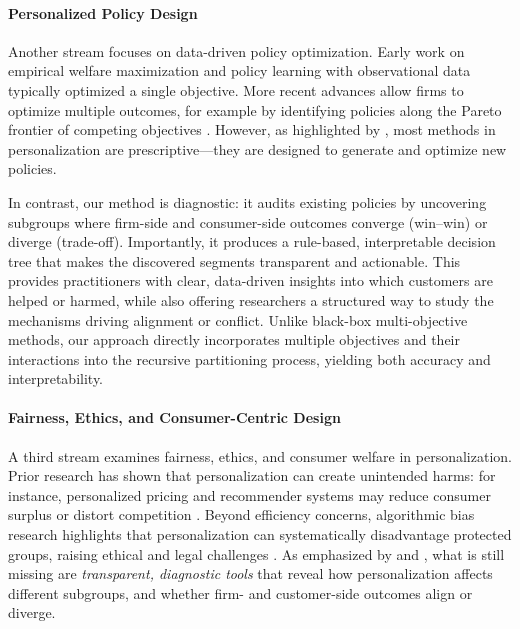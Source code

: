 \documentclass[11pt,letterpaper,english]{article}
\begin{document}
\paragraph{Personalized Policy Design}  
Another stream focuses on data-driven policy optimization. Early work on empirical welfare maximization \citep{kitagawa2018should} and policy learning with observational data \citep{athey2021policy} typically optimized a single objective. More recent advances allow firms to optimize multiple outcomes, for example by identifying policies along the Pareto frontier of competing objectives \citep{rafieian2025multiobjective}. However, as highlighted by \citet{lemmens2025personalization}, most methods in personalization are prescriptive—they are designed to generate and optimize new policies.  

In contrast, our method is diagnostic: it audits existing policies by uncovering subgroups where firm-side and consumer-side outcomes converge (win–win) or diverge (trade-off). Importantly, it produces a rule-based, interpretable decision tree that makes the discovered segments transparent and actionable. This provides practitioners with clear, data-driven insights into which customers are helped or harmed, while also offering researchers a structured way to study the mechanisms driving alignment or conflict. Unlike black-box multi-objective methods, our approach directly incorporates multiple objectives and their interactions into the recursive partitioning process, yielding both accuracy and interpretability.


\paragraph{Fairness, Ethics, and Consumer-Centric Design}  
A third stream examines fairness, ethics, and consumer welfare in personalization. Prior research has shown that personalization can create unintended harms: for instance, personalized pricing and recommender systems may reduce consumer surplus or distort competition \citep{dube2023personalized, zhou2023competing, donnelly2024welfare}. Beyond efficiency concerns, algorithmic bias research highlights that personalization can systematically disadvantage protected groups, raising ethical and legal challenges \citep{lambrecht2019algorithmic}.  As emphasized by \citet{rai2020explainable} and \citet{lemmens2025personalization}, what is still missing are \textit{transparent, diagnostic tools} that reveal how personalization affects different subgroups, and whether firm- and customer-side outcomes align or diverge. 
\end{document}
